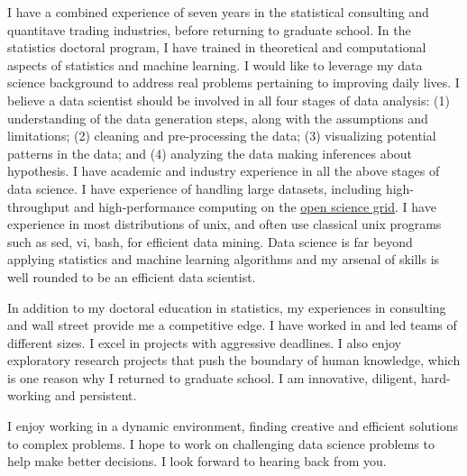 \documentclass{letter} %
\begin{document}
\begin{letter}
\noindent %
I have a combined experience of seven years in the statistical consulting and quantitave trading industries, before returning to graduate school. In the statistics doctoral program, I have trained in theoretical and computational aspects of statistics and machine learning. I would like to leverage my data science background to address real problems pertaining to improving daily lives. I believe a data scientist should be involved in all four stages of data analysis: (1) understanding of the data generation steps, along with the assumptions and limitations; (2) cleaning and pre-processing the data; (3) visualizing potential patterns in the data; and (4) analyzing the data making inferences about hypothesis. I have academic and industry experience in all the above stages of data science. I have experience of handling large datasets, including high-throughput and high-performance computing on the \href{http://www.opensciencegrid.org/}{open science grid}. I have experience in most distributions of unix, and often use classical unix programs such as sed, vi, bash, for efficient data mining. Data science is far beyond applying statistics and machine learning algorithms and my arsenal of skills is well rounded to be an efficient data scientist. 

In addition to my doctoral education in statistics, my experiences in consulting and wall street provide me a competitive edge. I have worked in and led teams of different sizes. I excel in projects with aggressive deadlines. I also enjoy exploratory research projects that push the boundary of human knowledge, which is one reason why I returned to graduate school. I am innovative, diligent, hard-working and persistent. 

\noindent %
I enjoy working in a dynamic environment, finding creative and efficient solutions to complex problems. I hope to work on challenging data science problems to help make better decisions. I look forward to hearing back from you.


\end{letter}
\end{document}
